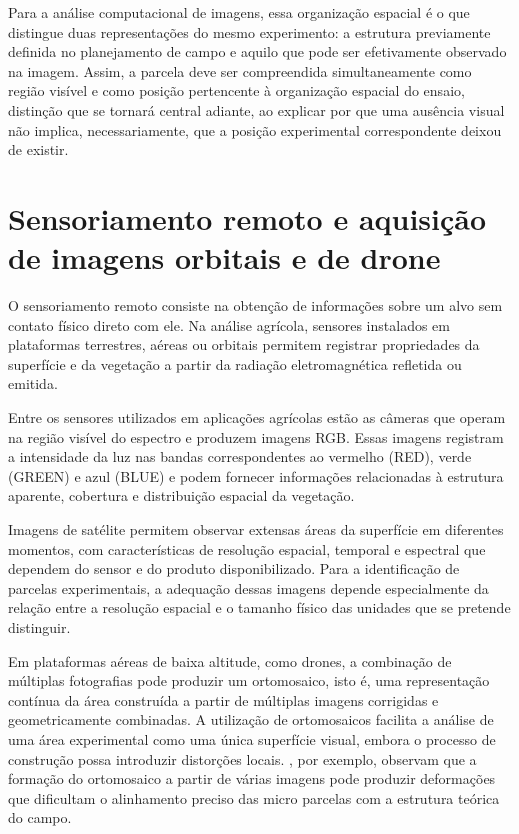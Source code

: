 Para a an\'alise computacional de imagens, essa organiza\c{c}\~ao espacial \'e o que distingue duas representa\c{c}\~oes do mesmo experimento: a estrutura previamente definida no planejamento de campo e aquilo que pode ser efetivamente observado na imagem. Assim, a parcela deve ser compreendida simultaneamente como regi\~ao vis\'ivel e como posi\c{c}\~ao pertencente \`a organiza\c{c}\~ao espacial do ensaio, distin\c{c}\~ao que se tornar\'a central adiante, ao explicar por que uma aus\^encia visual n\~ao implica, necessariamente, que a posi\c{c}\~ao experimental correspondente deixou de existir.

\section{Sensoriamento remoto e aquisi\c{c}\~ao de imagens orbitais e de drone}
\label{sec:sensoriamento-remoto}

O sensoriamento remoto consiste na obten\c{c}\~ao de informa\c{c}\~oes sobre um alvo sem contato f\'isico direto com ele. Na an\'alise agr\'icola, sensores instalados em plataformas terrestres, a\'ereas ou orbitais permitem registrar propriedades da superf\'icie e da vegeta\c{c}\~ao a partir da radia\c{c}\~ao eletromagn\'etica refletida ou emitida.

Entre os sensores utilizados em aplica\c{c}\~oes agr\'icolas est\~ao as c\^ameras que operam na regi\~ao vis\'ivel do espectro e produzem imagens RGB. Essas imagens registram a intensidade da luz nas bandas correspondentes ao vermelho (RED), verde (GREEN) e azul (BLUE) e podem fornecer informa\c{c}\~oes relacionadas \`a estrutura aparente, cobertura e distribui\c{c}\~ao espacial da vegeta\c{c}\~ao.

Imagens de sat\'elite permitem observar extensas \'areas da superf\'icie em diferentes momentos, com caracter\'isticas de resolu\c{c}\~ao espacial, temporal e espectral que dependem do sensor e do produto disponibilizado. Para a identifica\c{c}\~ao de parcelas experimentais, a adequa\c{c}\~ao dessas imagens depende especialmente da rela\c{c}\~ao entre a resolu\c{c}\~ao espacial e o tamanho f\'isico das unidades que se pretende distinguir.

Em plataformas a\'ereas de baixa altitude, como drones, a combina\c{c}\~ao de m\'ultiplas fotografias pode produzir um ortomosaico, isto \'e, uma representa\c{c}\~ao cont\'inua da \'area constru\'ida a partir de m\'ultiplas imagens corrigidas e geometricamente combinadas. A utiliza\c{c}\~ao de ortomosaicos facilita a an\'alise de uma \'area experimental como uma \'unica superf\'icie visual, embora o processo de constru\c{c}\~ao possa introduzir distor\c{c}\~oes locais. \citet{mardanisamani2021}, por exemplo, observam que a forma\c{c}\~ao do ortomosaico a partir de v\'arias imagens pode produzir deforma\c{c}\~oes que dificultam o alinhamento preciso das micro parcelas com a estrutura te\'orica do campo.

